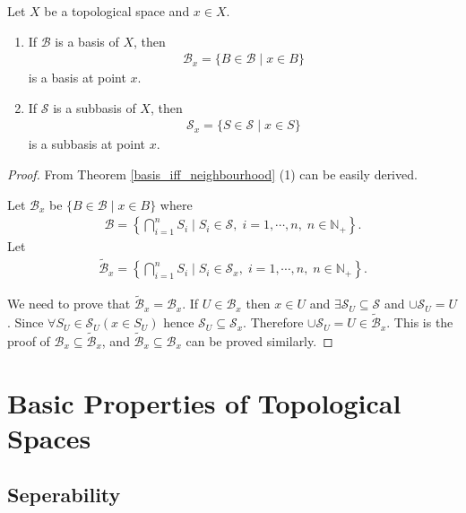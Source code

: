 \documentclass[openany]{book}
\begin{document}
\begin{theorem}\label{basis_subbasis_topology_and_neighbourhood}
Let $X$ be a topological space and $x \in X$.
\begin{enumerate}[label=(\arabic*)]
\item If $\mathscr B$ is a basis of $X$, then
\begin{align*}
	\mathscr B_x = \{B\in \mathscr B\mid x \in B\}
\end{align*}
is a basis at point $x$.
\item If $\mathscr S$ is a subbasis of $X$, then
\begin{align*}
	\mathscr S_x = \{S\in \mathscr S\mid x \in S\}
\end{align*}
is a subbasis at point $x$.
\end{enumerate}
\end{theorem}
\begin{proof}
From Theorem \ref{basis_iff_neighbourhood} (1) can be easily derived. 

Let $\mathscr B_x$ be $\{B\in \mathscr B\mid x\in B\}$ where
\begin{align*}
	\mathscr B = \left\{
		\bigcap\limits_{i=1}^n S_i \mid
			S_i \in \mathscr S,\;i=1,\cdots,n,\;n\in\mathbb N_+\right\}.
\end{align*}
Let
\begin{align*}
	\tilde{\mathscr B}_x = \left\{
		\bigcap\limits_{i=1}^n S_i \mid
			S_i \in \mathscr S_x,\;i=1,\cdots,n,\;n\in\mathbb N_+\right\}.
\end{align*}

We need to prove that $\tilde{\mathscr B}_x = \mathscr B_x$. 
If $U \in \mathscr B_x$ then
$x\in U$ and $\exists \mathscr S_U \subseteq \mathscr S$ and $\cup \mathscr S_U = U$.
Since $\forall S_U \in \mathscr S_U (x\in S_U)$ hence $\mathscr S_U \subseteq \mathscr S_x$.
Therefore $\cup \mathscr S_U = U \in \tilde{\mathscr B}_x$. 
This is the proof of $\mathscr B_x \subseteq \tilde{\mathscr B}_x$, 
and $\tilde{\mathscr B}_x \subseteq \mathscr B_x$ can be proved similarly.
\end{proof}

\chapter{Basic Properties of Topological Spaces}

\section{Seperability}
\end{document}
